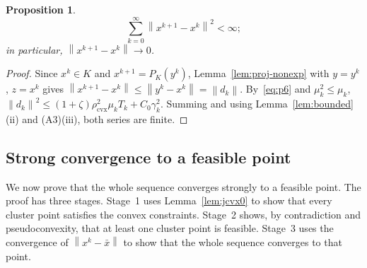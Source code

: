 \documentclass[]{interact}
\theoremstyle{plain}
\newtheorem{proposition}[theorem]{Proposition}
\theoremstyle{definition}
\theoremstyle{remark}
\newcommand{\norm}[1]{\left\lVert #1 \right\rVert}
\newcommand{\cvx}{\mathrm{cvx}}
\begin{document}
\begin{proposition}\label{prop:regularity}
\[
\sum_{k=0}^{\infty}\norm{x^{k+1}-x^k}^{2}<\infty;
\]
in particular,
$\norm{x^{k+1}-x^k}\to0$.
\end{proposition}
\begin{proof}
Since $x^k\in K$ and $x^{k+1}=P_K(y^k)$, Lemma~\ref{lem:proj-nonexp} with $y=y^k$, $z=x^k$
gives $\norm{x^{k+1}-x^k}\le\norm{y^k-x^k}=\norm{d_k}$. By~\eqref{eq:p6} and
$\mu_k^2\le\mu_k$, $\norm{d_k}^2\le(1+\zeta)\rho_{\cvx}^2\mu_k T_k+C_0\gamma_k^2$.
Summing and using Lemma~\ref{lem:bounded}(ii) and (A3)(iii), both series are finite.
\end{proof}

\subsection{Strong convergence to a feasible point}\label{ssec:strong}
We now prove that the whole sequence converges strongly to a feasible point. The proof has three
stages. Stage~1 uses Lemma~\ref{lem:jcvx0} to show that every cluster point satisfies the
convex constraints. Stage~2 shows, by contradiction and pseudoconvexity, that at least one
cluster point is feasible. Stage~3 uses the convergence of $\norm{x^k-\bar x}$ to show that
the whole sequence converges to that point.
\end{document}
